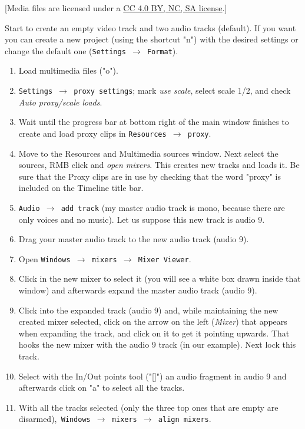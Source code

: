 [Media files are licensed under a \href{https://creativecommons.org/licenses/by-nc-sa/4.0/legalcode}{CC 4.0 BY, NC, SA license}.]

Start \CGG{} to create an empty video track and two audio tracks (default). If you want you can create a new project (using the shortcut "n") with the desired settings or change the default one (\texttt{Settings $\rightarrow$ Format}).

\begin{enumerate}
	\item Load multimedia files ("o").
	\item \texttt{Settings $\rightarrow$ proxy settings}; mark \textit{use scale}, select scale 1/2, and check \textit{Auto proxy/scale loads}.
	\item Wait until the progress bar at bottom right of the main window finishes to create and load proxy clips in \texttt{Resources $\rightarrow$ proxy}.
	\item Move to the Resources and Multimedia sources window. Next select the sources, RMB click and \textit{open mixers}. This creates new tracks and loads it. Be sure that the Proxy clips are in use by checking that the word "proxy" is included on the Timeline title bar.
	\item \texttt{Audio $\rightarrow$ add track} (my master audio track is mono, because there are only voices and no music). Let us suppose this new track is audio 9.
	\item Drag your master audio track to the new audio track (audio 9).
	\item Open \texttt{Windows $\rightarrow$ mixers $\rightarrow$ Mixer Viewer}.
	\item Click in the new mixer to select it (you will see a white box drawn inside that window) and afterwards expand the master audio track (audio 9).
	\item Click into the expanded track (audio 9) and, while maintaining the new created mixer selected, click on the arrow on the left (\textit{Mixer}) that appears when expanding the track, and click on it to get it pointing upwards. That hooks the new mixer with the audio 9 track (in our example). Next lock this track.
	\item Select with the In/Out points tool ("[]") an audio fragment in audio 9 and afterwards click on "a" to select all the tracks.
	\item With all the tracks selected (only the three top ones that are empty are disarmed),\texttt{ Windows $\rightarrow$ mixers $\rightarrow$ align mixers}.

\end{enumerate}
